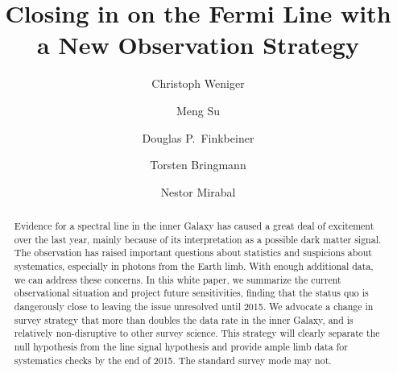\documentclass[aps,prd,superscriptaddress,nofootinbib,fixlfloat, 12pt]{revtex4-1}
\begin{document}
\title{Closing in on the Fermi Line with a New Observation Strategy}

\author{Christoph Weniger}

\author{Meng Su}

\author{Douglas P.~Finkbeiner}

\author{Torsten Bringmann}

\author{Nestor Mirabal}

\begin{abstract}
  Evidence for a spectral line in the inner Galaxy has caused a great deal of
  excitement over the last year, mainly because of its interpretation as a
  possible dark matter signal.  The observation has raised important questions
  about statistics and suspicions about systematics, especially in photons
  from the Earth limb.  With enough additional data, we can address these
  concerns.  In this white paper, we summarize the current
  observational situation and project future sensitivities, finding that the
  status quo is dangerously close to leaving the issue unresolved until 2015.  We
  advocate a change in survey strategy that more than doubles the data rate in
  the inner Galaxy, and is relatively non-disruptive to other survey science.  
  This strategy will clearly separate the null hypothesis from the line signal
  hypothesis and provide ample limb data for systematics checks by the end of
  2015. The standard survey mode may not. 
\end{abstract}
\end{document}
